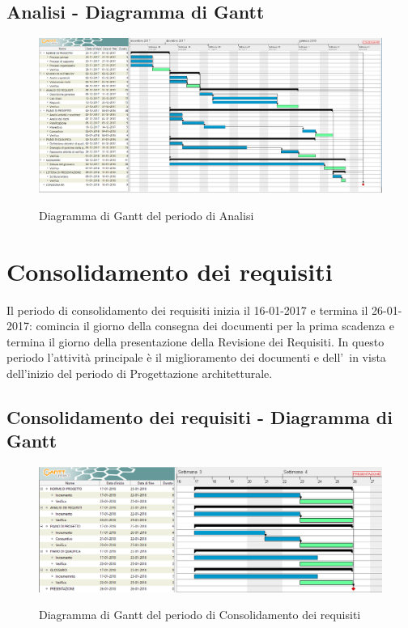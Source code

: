 \documentclass[PianoDiProgetto.tex]{subfiles}
\begin{document}
\begin{landscape}
	\subsection{Analisi - Diagramma di Gantt}
	\begin{figure}[ht]	
		\includegraphics[width=20.5cm]{images/gantt/analisi.png}
		\label{fig:foo}
		\caption{Diagramma di Gantt del periodo di Analisi}		
	\end{figure}			
\end{landscape}	

\section{Consolidamento dei requisiti}
Il periodo di consolidamento dei requisiti inizia il 16-01-2017 e termina il 26-01-2017: comincia il giorno della consegna dei documenti per la prima scadenza e termina il giorno della presentazione della Revisione dei Requisiti. In questo periodo l'attività principale è il miglioramento dei documenti e dell'\analisideirequisiti\ in vista dell'inizio del periodo di Progettazione architetturale.
\subsection{Consolidamento dei requisiti - Diagramma di Gantt}
\begin{figure}[ht]
	\includegraphics[width=14.5cm]{images/gantt/consolidamento.png}
	\label{fig:foo}
	\caption{Diagramma di Gantt del periodo di Consolidamento dei requisiti}
\end{figure}		
\end{document}
